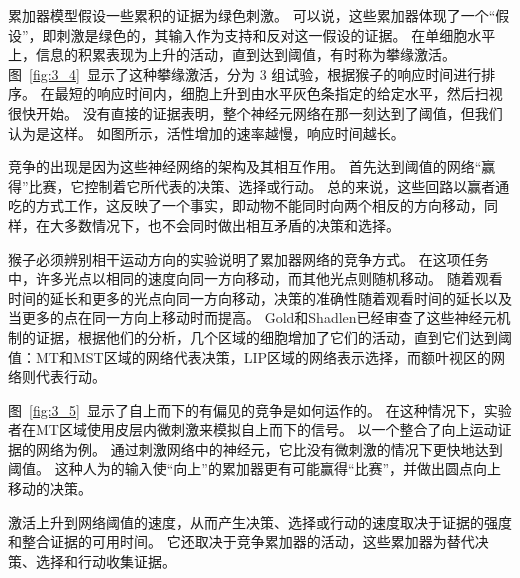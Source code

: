 累加器模型假设一些累积的证据为绿色刺激。
可以说，这些累加器体现了一个“假设”，即刺激是绿色的，其输入作为支持和反对这一假设的证据。
在单细胞水平上，信息的积累表现为上升的活动，直到达到阈值，有时称为攀缘激活。
图~\ref{fig:3_4}~显示了这种攀缘激活，分为 3 组试验，根据猴子的响应时间进行排序。
在最短的响应时间内，细胞上升到由水平灰色条指定的给定水平，然后扫视很快开始。
没有直接的证据表明，整个神经元网络在那一刻达到了阈值，但我们认为是这样。
如图所示，活性增加的速率越慢，响应时间越长。\par


竞争的出现是因为这些神经网络的架构及其相互作用。
首先达到阈值的网络“赢得”比赛，它控制着它所代表的决策、选择或行动。
总的来说，这些回路以赢者通吃的方式工作，这反映了一个事实，即动物不能同时向两个相反的方向移动，同样，在大多数情况下，也不会同时做出相互矛盾的决策和选择。\par


猴子必须辨别相干运动方向的实验说明了累加器网络的竞争方式。
在这项任务中，许多光点以相同的速度向同一方向移动，而其他光点则随机移动。
随着观看时间的延长和更多的光点向同一方向移动，决策的准确性随着观看时间的延长以及当更多的点在同一方向上移动时而提高\cite{schall2001neural}。
Gold和Shadlen已经审查了这些神经元机制的证据\cite{gold2007neural}，根据他们的分析，几个区域的细胞增加了它们的活动，直到它们达到阈值：MT和MST区域的网络代表决策，LIP区域的网络表示选择，而额叶视区的网络则代表行动\cite{kim1999neural}。\par


图~\ref{fig:3_5}~显示了自上而下的有偏见的竞争是如何运作的。
在这种情况下，实验者在MT区域使用皮层内微刺激来模拟自上而下的信号。
以一个整合了向上运动证据的网络为例。
通过刺激网络中的神经元，它比没有微刺激的情况下更快地达到阈值。
这种人为的输入使“向上”的累加器更有可能赢得“比赛”，并做出圆点向上移动的决策。\par


激活上升到网络阈值的速度，从而产生决策、选择或行动的速度取决于证据的强度和整合证据的可用时间。
它还取决于竞争累加器的活动，这些累加器为替代决策、选择和行动收集证据。\par


